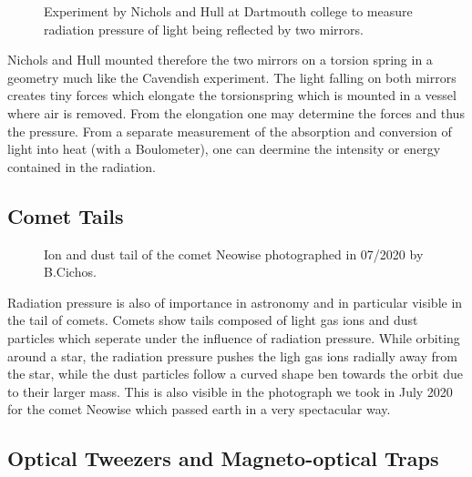 \documentclass[
  a4paper,
]{book}
\begin{document}
\begin{figure}
\begin{minipage}{0.50\linewidth}
\end{minipage}%

\caption{\label{fig-nichols-hull}Experiment by Nichols and Hull at
Dartmouth college to measure radiation pressure of light being reflected
by two mirrors.}

\end{figure}%

Nichols and Hull mounted therefore the two mirrors on a torsion spring
in a geometry much like the Cavendish experiment. The light falling on
both mirrors creates tiny forces which elongate the torsionspring which
is mounted in a vessel where air is removed. From the elongation one may
determine the forces and thus the pressure. From a separate measurement
of the absorption and conversion of light into heat (with a Boulometer),
one can deermine the intensity or energy contained in the radiation.

\subsection{Comet Tails}\label{comet-tails}

\begin{figure}


\caption{\label{fig-neowise}Ion and dust tail of the comet Neowise
photographed in 07/2020 by B.Cichos.}

\end{figure}%

Radiation pressure is also of importance in astronomy and in particular
visible in the tail of comets. Comets show tails composed of light gas
ions and dust particles which seperate under the influence of radiation
pressure. While orbiting around a star, the radiation pressure pushes
the ligh gas ions radially away from the star, while the dust particles
follow a curved shape ben towards the orbit due to their larger mass.
This is also visible in the photograph we took in July 2020 for the
comet Neowise which passed earth in a very spectacular way.

\subsection{Optical Tweezers and Magneto-optical
Traps}\label{optical-tweezers-and-magneto-optical-traps}
\end{document}
